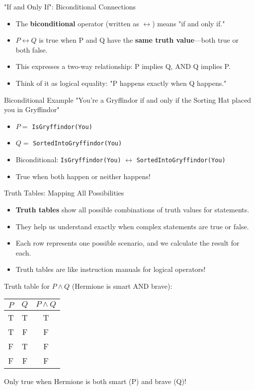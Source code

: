 \documentclass{beamer}
\begin{document}
	\begin{frame}{"If and Only If": Biconditional Connections}
		\begin{itemize}
			\item The \textbf{biconditional} operator (written as $\leftrightarrow$) means "if and only if."
			\item $P \leftrightarrow Q$ is true when P and Q have the \textbf{same truth value}—both true or both false.
			\item This expresses a two-way relationship: P implies Q, AND Q implies P.
			\item Think of it as logical equality: "P happens exactly when Q happens."
		\end{itemize}
		
		\begin{block}{Biconditional Example}
			"You're a Gryffindor if and only if the Sorting Hat placed you in Gryffindor"
			\begin{itemize}
				\item $P = $ \texttt{IsGryffindor(You)}
				\item $Q = $ \texttt{SortedIntoGryffindor(You)}
				\item Biconditional: \texttt{IsGryffindor(You)} $\leftrightarrow$ \texttt{SortedIntoGryffindor(You)}
				\item True when both happen or neither happens!
			\end{itemize}
		\end{block}
	\end{frame}
	
	\begin{frame}{Truth Tables: Mapping All Possibilities}
		\begin{itemize}
			\item \textbf{Truth tables} show all possible combinations of truth values for statements.
			\item They help us understand exactly when complex statements are true or false.
			\item Each row represents one possible scenario, and we calculate the result for each.
			\item Truth tables are like instruction manuals for logical operators!
		\end{itemize}
		
		\begin{example}
			Truth table for $P \land Q$ (Hermione is smart AND brave):
			\begin{table}
				\centering
				\begin{tabular}{|c|c|c|}
					\hline
					$P$ & $Q$ & $P \land Q$ \\
					\hline
					T & T & T \\
					T & F & F \\
					F & T & F \\
					F & F & F \\
					\hline
				\end{tabular}
			\end{table}
			Only true when Hermione is both smart (P) and brave (Q)!
		\end{example}
	\end{frame}
	
\end{document}
